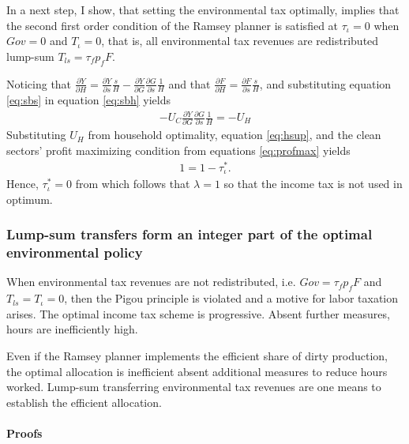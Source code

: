 In a next step, I show, that setting the environmental tax optimally, implies that the second first order condition of the Ramsey planner is satisfied at $\tau_\iota=0$ when $Gov=0$ and $T_\iota=0$, that is, all environmental tax revenues are redistributed lump-sum $T_{ls}=\tau_{f}p_fF$.

Noticing that $\frac{\partial Y}{\partial H}= \frac{\partial Y}{\partial s}\frac{s}{H}-\frac{\partial Y}{\partial G}\frac{\partial G}{\partial s}\frac{1}{H}$ and that $\frac{\partial F}{\partial H}=\frac{\partial F}{\partial s}\frac{s}{H}$, and substituting equation \ref{eq:sbs} in equation \ref{eq:sbh} yields
\begin{align}
-U_C \frac{\partial Y}{\partial G}\frac{\partial G}{\partial s}\frac{1}{H}=-U_H
\end{align}
Substituting $U_H$ from household optimality, equation \ref{eq:hsup}, and the clean sectors' profit maximizing condition from equations \ref{eq:profmax} yields
\begin{align}
1=1-\tau^*_\iota.
\end{align}
Hence, $\tau^*_\iota =0$ from which follows that $\lambda =1$ so that the income tax is not used in optimum. 


\subsubsection{Lump-sum transfers form an integer part of the optimal environmental policy}

\begin{prop}
When environmental tax revenues are not redistributed, i.e. $Gov=\tau_fp_fF$ and $T_{ls}=T_\iota=0$, then the Pigou principle is violated and a motive for labor taxation arises. The optimal income tax scheme is progressive. Absent further measures, hours are inefficiently high.  
\end{prop}
\begin{prop}\label{prop:1}
	Even if the Ramsey planner implements the efficient share of dirty production, %
	the optimal allocation is inefficient absent additional measures to reduce hours worked. Lump-sum transferring environmental tax revenues are one means to establish the efficient allocation. 
\end{prop}

\paragraph{Proofs}

